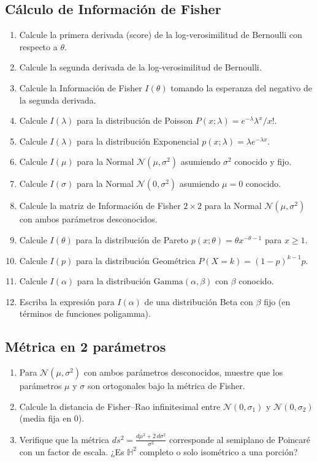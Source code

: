\subsection*{Cálculo de Información de Fisher}
\begin{enumerate}[resume]
	\item[$\star$] Calcule la primera derivada (score) de la log-verosimilitud de Bernoulli con respecto a $\theta$.
	\item[$\star$] Calcule la segunda derivada de la log-verosimilitud de Bernoulli.
	\item[$\star$] Calcule la Información de Fisher $I(\theta)$ tomando la esperanza del negativo de la segunda derivada.
	\item[$\star$] Calcule $I(\lambda)$ para la distribución de Poisson $P(x;\lambda) = e^{-\lambda}\lambda^x/x!$.
	\item[$\star$] Calcule $I(\lambda)$ para la distribución Exponencial $p(x;\lambda) = \lambda e^{-\lambda x}$.
	\item[$\star$] Calcule $I(\mu)$ para la Normal $\mathcal{N}(\mu, \sigma^2)$ asumiendo $\sigma^2$ conocido y fijo.
	\item[$\star$] Calcule $I(\sigma)$ para la Normal $\mathcal{N}(0, \sigma^2)$ asumiendo $\mu=0$ conocido.
	\item[$\star\star$] Calcule la matriz de Información de Fisher $2\times2$ para la Normal $\mathcal{N}(\mu, \sigma^2)$ con ambos parámetros desconocidos.
	\item[$\star\star$] Calcule $I(\theta)$ para la distribución de Pareto $p(x;\theta) = \theta x^{-\theta-1}$ para $x \ge 1$.
	\item[$\star\star$] Calcule $I(p)$ para la distribución Geométrica $P(X=k) = (1-p)^{k-1}p$.
	\item[$\star\star$] Calcule $I(\alpha)$ para la distribución $\mathrm{Gamma}(\alpha, \beta)$ con $\beta$ conocido.
	\item[$\star\star\star$] Escriba la expresión para $I(\alpha)$ de una distribución Beta con $\beta$ fijo (en términos de funciones poligamma).
\end{enumerate}

\subsection*{Métrica en 2 parámetros}
\begin{enumerate}[resume]
	\item[$\star\star$] Para $\mathcal{N}(\mu, \sigma^2)$ con ambos parámetros desconocidos, muestre que los parámetros $\mu$ y $\sigma$ son ortogonales bajo la métrica de Fisher.
	\item[$\star\star$] Calcule la distancia de Fisher--Rao infinitesimal entre $\mathcal{N}(0, \sigma_1)$ y $\mathcal{N}(0, \sigma_2)$ (media fija en 0).
	\item[$\star\star\star$] Verifique que la métrica $ds^2 = \frac{d\mu^2 + 2\,d\sigma^2}{\sigma^2}$ corresponde al semiplano de Poincaré con un factor de escala. ¿Es $\mathbb{H}^2$ completo o solo isométrico a una porción?
\end{enumerate}

